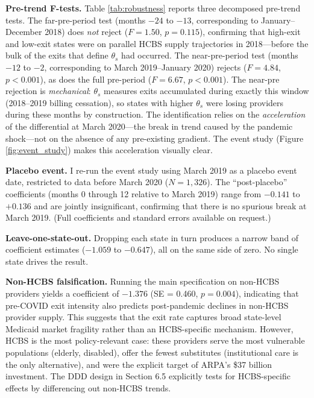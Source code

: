 \documentclass[12pt]{article}
\begin{document}
\textbf{Pre-trend F-tests.} Table \ref{tab:robustness} reports three decomposed pre-trend tests. The far-pre-period test (months $-24$ to $-13$, corresponding to January--December 2018) does \emph{not} reject ($F = 1.50$, $p = 0.115$), confirming that high-exit and low-exit states were on parallel HCBS supply trajectories in 2018---before the bulk of the exits that define $\theta_s$ had occurred. The near-pre-period test (months $-12$ to $-2$, corresponding to March 2019--January 2020) rejects ($F = 4.84$, $p < 0.001$), as does the full pre-period ($F = 6.67$, $p < 0.001$). The near-pre rejection is \emph{mechanical}: $\theta_s$ measures exits accumulated during exactly this window (2018--2019 billing cessation), so states with higher $\theta_s$ were losing providers during these months by construction. The identification relies on the \emph{acceleration} of the differential at March 2020---the break in trend caused by the pandemic shock---not on the absence of any pre-existing gradient. The event study (Figure \ref{fig:event_study}) makes this acceleration visually clear.

\textbf{Placebo event.} I re-run the event study using March 2019 as a placebo event date, restricted to data before March 2020 ($N = 1{,}326$). The ``post-placebo'' coefficients (months 0 through 12 relative to March 2019) range from $-0.141$ to $+0.136$ and are jointly insignificant, confirming that there is no spurious break at March 2019. (Full coefficients and standard errors available on request.)

\textbf{Leave-one-state-out.} Dropping each state in turn produces a narrow band of coefficient estimates ($-1.059$ to $-0.647$), all on the same side of zero. No single state drives the result.

\textbf{Non-HCBS falsification.} Running the main specification on non-HCBS providers yields a coefficient of $-1.376$ (SE = 0.460, $p = 0.004$), indicating that pre-COVID exit intensity also predicts post-pandemic declines in non-HCBS provider supply. This suggests that the exit rate captures broad state-level Medicaid market fragility rather than an HCBS-specific mechanism. However, HCBS is the most policy-relevant case: these providers serve the most vulnerable populations (elderly, disabled), offer the fewest substitutes (institutional care is the only alternative), and were the explicit target of ARPA's \$37 billion investment. The DDD design in Section 6.5 explicitly tests for HCBS-specific effects by differencing out non-HCBS trends.
\end{document}
